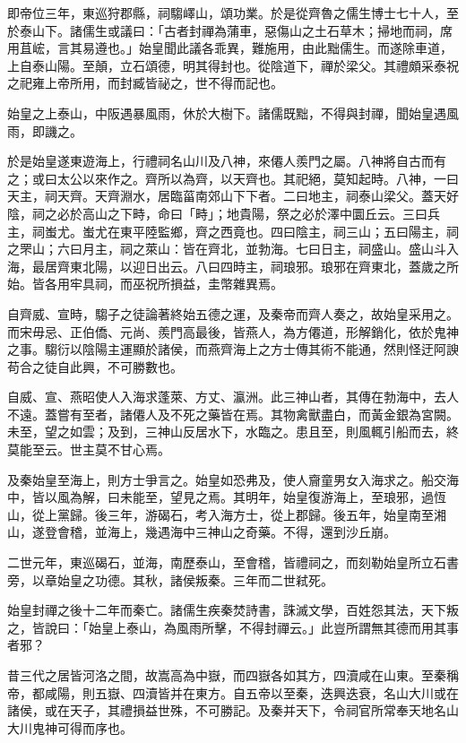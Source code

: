 \begin{pinyinscope}
即帝位三年，東巡狩郡縣，祠騶嶧山，頌功業。於是從齊魯之儒生博士七十人，至於泰山下。諸儒生或議曰：「古者封禪為蒲車，惡傷山之土石草木；掃地而祠，席用苴峵，言其易遵也。」始皇聞此議各乖異，難施用，由此黜儒生。而遂除車道，上自泰山陽。至顛，立石頌德，明其得封也。從陰道下，禪於梁父。其禮頗采泰祝之祀雍上帝所用，而封臧皆祕之，世不得而記也。

始皇之上泰山，中阪遇暴風雨，休於大樹下。諸儒既黜，不得與封禪，聞始皇遇風雨，即譏之。

於是始皇遂東遊海上，行禮祠名山川及八神，來僊人羨門之屬。八神將自古而有之；或曰太公以來作之。齊所以為齊，以天齊也。其祀絕，莫知起時。八神，一曰天主，祠天齊。天齊淵水，居臨菑南郊山下下者。二曰地主，祠泰山梁父。蓋天好陰，祠之必於高山之下畤，命曰「畤」；地貴陽，祭之必於澤中圜丘云。三曰兵主，祠蚩尤。蚩尤在東平陸監鄉，齊之西竟也。四曰陰主，祠三山；五曰陽主，祠之罘山；六曰月主，祠之萊山：皆在齊北，並勃海。七曰日主，祠盛山。盛山斗入海，最居齊東北陽，以迎日出云。八曰四時主，祠琅邪。琅邪在齊東北，蓋歲之所始。皆各用牢具祠，而巫祝所損益，圭幣雜異焉。

自齊威、宣時，騶子之徒論著終始五德之運，及秦帝而齊人奏之，故始皇采用之。而宋毋忌、正伯僑、元尚、羨門高最後，皆燕人，為方僊道，形解銷化，依於鬼神之事。騶衍以陰陽主運顯於諸侯，而燕齊海上之方士傳其術不能通，然則怪迂阿諛苟合之徒自此興，不可勝數也。

自威、宣、燕昭使人入海求蓬萊、方丈、瀛洲。此三神山者，其傳在勃海中，去人不遠。蓋嘗有至者，諸僊人及不死之藥皆在焉。其物禽獸盡白，而黃金銀為宮闕。未至，望之如雲；及到，三神山反居水下，水臨之。患且至，則風輒引船而去，終莫能至云。世主莫不甘心焉。

及秦始皇至海上，則方士爭言之。始皇如恐弗及，使人齎童男女入海求之。船交海中，皆以風為解，曰未能至，望見之焉。其明年，始皇復游海上，至琅邪，過恆山，從上黨歸。後三年，游碣石，考入海方士，從上郡歸。後五年，始皇南至湘山，遂登會稽，並海上，幾遇海中三神山之奇藥。不得，還到沙丘崩。

二世元年，東巡碣石，並海，南歷泰山，至會稽，皆禮祠之，而刻勒始皇所立石書旁，以章始皇之功德。其秋，諸侯叛秦。三年而二世弒死。

始皇封禪之後十二年而秦亡。諸儒生疾秦焚詩書，誅滅文學，百姓怨其法，天下叛之，皆說曰：「始皇上泰山，為風雨所擊，不得封禪云。」此豈所謂無其德而用其事者邪？

昔三代之居皆河洛之間，故嵩高為中嶽，而四嶽各如其方，四瀆咸在山東。至秦稱帝，都咸陽，則五嶽、四瀆皆并在東方。自五帝以至秦，迭興迭衰，名山大川或在諸侯，或在天子，其禮損益世殊，不可勝記。及秦并天下，令祠官所常奉天地名山大川鬼神可得而序也。


\end{pinyinscope}
